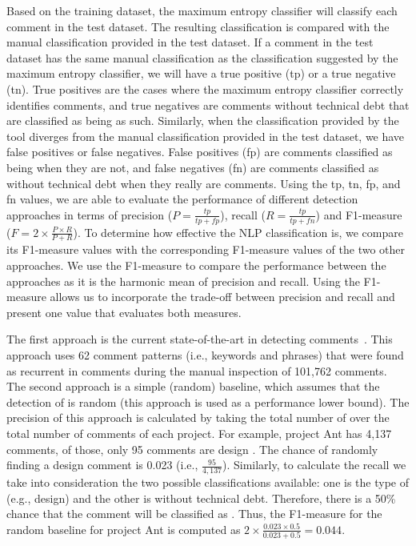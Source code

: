 Based on the training dataset, the maximum entropy classifier will classify each comment in the test dataset. The resulting classification is compared with the manual classification provided in the test dataset. If a comment in the test dataset has the same manual classification as the classification suggested by the maximum entropy classifier, we will have a true positive (tp) or a true negative (tn). True positives are the cases where the maximum entropy classifier correctly identifies \SATD comments, and true negatives are comments without technical debt that are classified as being as such. Similarly, when the classification provided by the tool diverges from the manual classification provided in the test dataset, we have false positives or false negatives. False positives (fp) are comments classified as being \SATD when they are not, and false negatives (fn) are comments classified as without technical debt when they really are \SATD comments. Using the tp, tn, fp, and fn values, we are able to evaluate the performance of different detection approaches in terms of precision ($P=\frac{tp}{tp + fp}$), recall ($R=\frac{tp}{tp + fn}$) and F1-measure ($F=2 \times \frac{P \times R}{P + R}$). To determine how effective the NLP classification is, we compare its F1-measure values with the corresponding F1-measure values of the two other approaches. We use the F1-measure to compare the performance between the approaches as it is the harmonic mean of precision and recall. Using the F1-measure allows us to incorporate the trade-off between precision and recall and present one value that evaluates both measures.

The first approach is the current state-of-the-art in detecting \SATD comments~\cite{Potdar2014ICSME}. This approach uses 62 comment patterns (i.e., keywords and phrases) that were found as recurrent in \SATD comments during the manual inspection of 101,762 comments. The second approach is a simple (random) baseline, which assumes that the detection of \SATD is random (this approach is used as a performance lower bound). The precision of this approach is calculated by taking the total number of \SATD over the total number of comments of each project. For example, project Ant has 4,137 comments, of those, only 95 comments are design \SATD. The chance of randomly finding a design \SATD comment is 0.023 (i.e., $\frac{95}{4,137}$). Similarly, to calculate the recall we take into consideration the two possible classifications available: one is the type of \SATD (e.g., design) and the other is without technical debt. Therefore, there is a 50\% chance that the comment will be classified as \SATD. Thus, the F1-measure for the random baseline for project Ant is computed as $2 \times \frac{0.023 \times 0.5}{0.023 + 0.5} = 0.044$.

